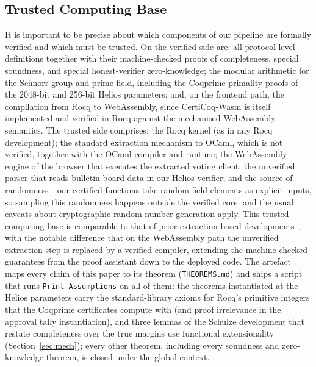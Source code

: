 \subsection{Trusted Computing Base}\label{tcb}
It is important to be precise about which components of our pipeline are formally verified and which must be trusted. On the verified side are: all protocol-level definitions together with their machine-checked proofs of completeness, special soundness, and special honest-verifier zero-knowledge; the modular arithmetic for the Schnorr group and prime field, including the Coqprime primality proofs of the 2048-bit and 256-bit Helios parameters; and, on the frontend path, the compilation from Rocq to WebAssembly, since CertiCoq-Wasm is itself implemented and verified in Rocq against the mechanised WebAssembly semantics. The trusted side comprises: the Rocq kernel (as in any Rocq development); the standard extraction mechanism to OCaml, which is not verified, together with the OCaml compiler and runtime; the WebAssembly engine of the browser that executes the extracted voting client; the unverified parser that reads bulletin-board data in our Helios verifier; and the source of randomness---our certified functions take random field elements as explicit inputs, so sampling this randomness happens outside the verified core, and the usual caveats about cryptographic random number generation apply. This trusted computing base is comparable to that of prior extraction-based developments~\cite{287095}, with the notable difference that on the WebAssembly path the unverified extraction step is replaced by a verified compiler, extending the machine-checked guarantees from the proof assistant down to the deployed code. The artefact maps every claim of this paper to its theorem (\texttt{THEOREMS.md}) and ships a script that runs \texttt{Print Assumptions} on all of them: the theorems instantiated at the Helios parameters carry the standard-library axioms for Rocq's primitive integers that the Coqprime certificates compute with (and proof irrelevance in the approval tally instantiation), and three lemmas of the Schulze development that restate completeness over the true margins use functional extensionality (Section~\ref{sec:mech}); every other theorem, including every soundness and zero-knowledge theorem, is closed under the global context.




